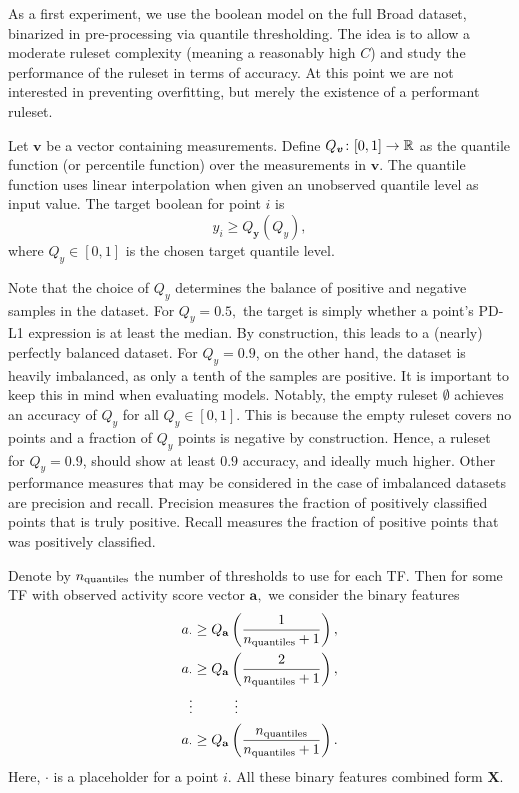 As a first experiment, we use the boolean model on the full Broad dataset,
binarized in pre-processing via quantile thresholding.
The idea is to allow a moderate ruleset complexity (meaning a reasonably high $C$)
and study the performance of the ruleset in terms of accuracy.
At this point we are not interested in preventing overfitting, but merely the existence of a performant ruleset.

Let $\bm{v}$ be a vector containing measurements.
Define $Q_{\bm{v}}\colon[0,1] \to \mathbb{R}$ as the quantile function (or percentile function) over the measurements in $\bm{v}$.
The quantile function uses linear interpolation when given an unobserved quantile level as input value.
The target boolean for point $i$ is
\[y_i \geq Q_{\bm{y}}(Q_y),\]
where $Q_y \in [0,1]$ is the chosen target quantile level.

Note that the choice of $Q_y$ determines the balance of positive and negative samples in the dataset.
For $Q_y = 0.5,$ the target is simply whether a point's PD-L1 expression is at least the median.
By construction, this leads to a (nearly) perfectly balanced dataset.
For $Q_y = 0.9$, on the other hand, the dataset is heavily imbalanced, as only a tenth of the samples are positive.
It is important to keep this in mind when evaluating models.
Notably, the empty ruleset $\emptyset$ achieves an accuracy of $Q_y$ for all $Q_y \in [0,1]$.
This is because the empty ruleset covers no points and a fraction of $Q_y$ points is negative by construction.
Hence, a ruleset for $Q_y = 0.9$, should show at least $0.9$ accuracy, and ideally much higher.
Other performance measures that may be considered in the case of imbalanced datasets are precision and recall.
Precision measures the fraction of positively classified points that is truly positive.
Recall measures the fraction of positive points that was positively classified.

Denote by $n_{\text{quantiles}}$ the number of thresholds to use for each TF\@.
Then for some TF with observed activity score vector $\bm{a},$ we consider the binary features
\begin{equation}\label{eq:BM_TF_activity_quantiles}
    \begin{split}
        a_{\cdot} &\geq Q_{\mathbf{a}}\left(\frac{1}{n_\text{quantiles}+1}\right), \\
        a_{\cdot} &\geq Q_{\mathbf{a}}\left(\frac{2}{n_\text{quantiles}+1}\right), \\
        \vdots & \quad \quad \quad \vdots \\
        a_{\cdot} &\geq Q_{\mathbf{a}}\left(\frac{n_\text{quantiles}}{n_\text{quantiles}+1}\right).
    \end{split}
\end{equation}
Here, $\cdot$ is a placeholder for a point $i$.
All these binary features combined form $\bm{X}.$

